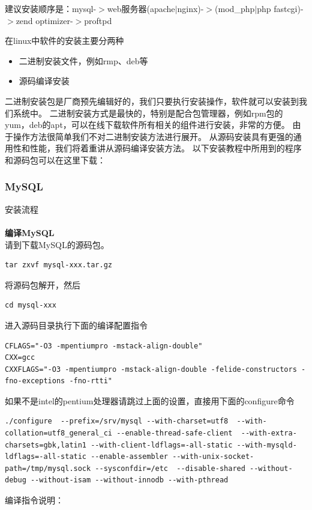 \documentclass{article}
\begin{document}
建议安装顺序是：mysql-$>$web服务器(apache$|$nginx)-$>$(mod\_php$|$php fastcgi)-$>$zend optimizer-$>$proftpd

在linux中软件的安装主要分两种

\begin{itemize}
\item 二进制安装文件，例如rmp、deb等
\item 源码编译安装
\end{itemize}

二进制安装包是厂商预先编辑好的，我们只要执行安装操作，软件就可以安装到我们系统中。
二进制安装方式是最快的，特别是配合包管理器，例如rpm包的yum，deb的apt，可以在线下载软件所有相关的组件进行安装，非常的方便。
由于操作方法很简单我们不对二进制安装方法进行展开。
从源码安装具有更强的通用性和性能，我们将着重讲从源码编译安装方法。
以下安装教程中所用到的程序和源码包可以在这里下载： 


\hypertarget{toc4}{}
\subsubsection{MySQL}
安装流程

\paragraph{}\textbf{编译MySQL}\\

请到下载MySQL的源码包。

\begin{verbatim}
tar zxvf mysql-xxx.tar.gz
\end{verbatim}
将源码包解开，然后

\begin{verbatim}
cd mysql-xxx
\end{verbatim}

进入源码目录执行下面的编译配置指令

\begin{verbatim}
CFLAGS="-O3 -mpentiumpro -mstack-align-double"
CXX=gcc
CXXFLAGS="-O3 -mpentiumpro -mstack-align-double -felide-constructors -fno-exceptions -fno-rtti"
\end{verbatim}
如果不是intel的pentium处理器请跳过上面的设置，直接用下面的configure命令

\begin{verbatim}
./configure  --prefix=/srv/mysql --with-charset=utf8  --with-collation=utf8_general_ci --enable-thread-safe-client  --with-extra-charsets=gbk,latin1 --with-client-ldflags=-all-static --with-mysqld-ldflags=-all-static --enable-assembler --with-unix-socket-path=/tmp/mysql.sock --sysconfdir=/etc  --disable-shared --without-debug --without-isam --without-innodb --with-pthread
\end{verbatim}
编译指令说明：
\end{document}
